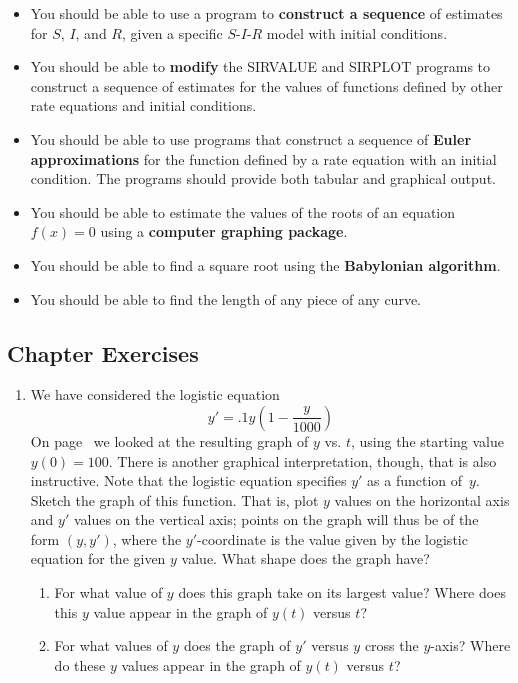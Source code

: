 \begin{itemize}

\item You should be able to use a program to {\bf construct a
 sequence} of estimates for $S$, $I$, and $R$, given a specific
 $S$-$I$-$R$ model with initial conditions.

\item You should be able to {\bf modify} the SIRVALUE and SIRPLOT
 programs to construct a sequence of estimates for the values of
 functions defined by other rate equations and initial conditions.

\item You should be able to use programs that construct a sequence of
 {\bf Euler approximations} for the function defined by a rate
 equation with an initial condition.  The programs should provide both
 tabular and graphical output.

\item You should be able to estimate the values of the roots of an
 equation $f(x) = 0$ using a {\bf computer graphing package}.

\item You should be able to find a square root using the {\bf
 Babylonian algorithm}.

\item You should be able to find the length of any piece of any curve.

\end{itemize}

\subsection{Chapter Exercises}
\label{subsec:chapter-exercises}


\begin{enumerate}
\item We have considered the logistic equation
\[
y' = {\displaystyle .1y \left( 1-\frac{y}{1000} \right)}
\]
On page~\pageref{`logistic'} we looked at the resulting graph of $y$
 vs. $t$, using the starting value $y(0)=100$.  There is another
 graphical interpretation, though, that is also instructive.  Note
 that the logistic equation specifies $y'$ as a function of~$y$.
  Sketch the graph of this function.  That is, plot $y$ values on the
 horizontal axis and $y'$ values on the vertical axis; points on the
 graph will thus be of the form $(y, y')$, where the $y'$-coordinate
 is the value given by the logistic equation for the given $y$ value.
  What shape does the graph have?

  \begin{enumerate}
  \item For what value of $y$ does this graph take on its largest value?
  Where does this $y$ value appear in the graph of $y(t)$ versus $t$?

  \item For what values of $y$ does the graph of $y'$ versus $y$ cross
 the $y$-axis?  Where do these $y$ values appear in the graph of
 $y(t)$ versus $t$?

\end{enumerate}
\end{enumerate}
